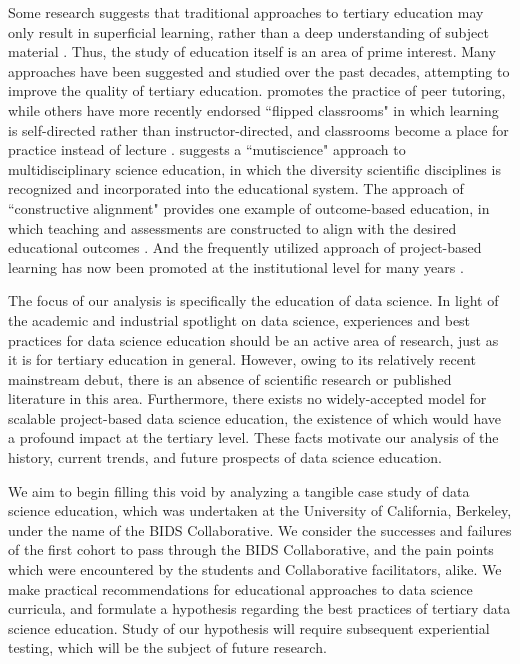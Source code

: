 \documentclass[12pt]{article}
\begin{document}
Some research suggests that traditional approaches to tertiary education may only result in superficial learning, rather than a deep understanding of subject material \citep{Entwistle1992}.  Thus, the study of education itself is an area of prime interest.  Many approaches have been suggested and studied over the past decades, attempting to improve the quality of tertiary education.  \citet{Topping1996} promotes the practice of peer tutoring, while others have more recently endorsed ``flipped classrooms" in which learning is self-directed rather than instructor-directed, and classrooms become a place for practice instead of lecture \citep{Horn2013, Herreid2013}.  \citet{Ogawa1995} suggests a ``mutiscience" approach to multidisciplinary science education, in which the diversity scientific disciplines is recognized and incorporated into the educational system.  The approach of ``constructive alignment" provides one example of outcome-based education, in which teaching and assessments are constructed to align with the desired educational outcomes \citep{biggs2003aligning, biggs2011teaching}.  And the frequently utilized approach of project-based learning has now been promoted at the institutional level for many years \citep{Thomas2000, Krajcik2006}.

The focus of our analysis is specifically the education of data science. In light of the academic and industrial spotlight on data science, experiences and best practices for data science education should be an active area of research, just as it is for tertiary education in general.  However, owing to its relatively recent mainstream debut, there is an absence of scientific research or published literature in this area.  Furthermore, there exists no widely-accepted model for scalable project-based data science education, the existence of which would have a profound impact at the tertiary level.  These facts motivate our analysis of the history, current trends, and future prospects of data science education.

We aim to begin filling this void by analyzing a tangible case study of data science education, which was undertaken at the University of California, Berkeley, under the name of the BIDS Collaborative. We consider the successes and failures of the first cohort to pass through the BIDS Collaborative, and the pain points which were encountered by the students and Collaborative facilitators, alike.  We make practical recommendations for educational approaches to data science curricula, and formulate a hypothesis regarding the best practices of tertiary data science education.  Study of our hypothesis will require subsequent experiential testing, which will be the subject of future research.
\end{document}
